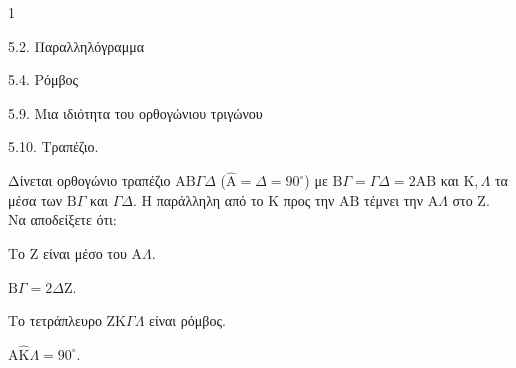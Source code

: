 \begin{ylh}{1}
    \item 5.2. Παραλληλόγραμμα
    \item 5.4. Ρόμβος
    \item 5.9. Μια ιδιότητα του ορθογώνιου τριγώνου
    \item 5.10. Τραπέζιο.
\end{ylh}
Δίνεται ορθογώνιο τραπέζιο $\mathrm{A}\mathrm{B}\Gamma\Delta$ ($\hat{\mathrm{A}} = \hat{\Delta} = 90^\circ$) με $\mathrm{B}\Gamma = \Gamma\Delta = 2\mathrm{A}\mathrm{B}$ και $\mathrm{K}, \Lambda$ τα μέσα των $\mathrm{B}\Gamma$ και $\Gamma\Delta$. Η παράλληλη από το $\mathrm{K}$ προς την $\mathrm{A}\mathrm{B}$ τέμνει την $\mathrm{A}\Lambda$ στο $\mathrm{Z}$.
Να αποδείξετε ότι:
\begin{alist}
    \item Το $\mathrm{Z}$ είναι μέσο του $\mathrm{A}\Lambda$. 
    \item $\mathrm{B}\Gamma = 2 \Delta\mathrm{Z}$. 
    \item Το τετράπλευρο $\mathrm{Z}\mathrm{K}\Gamma\Lambda$ είναι ρόμβος. 
    \item $\mathrm{A}\hat{\mathrm{K}}\Lambda = 90^\circ$. 
\end{alist}

